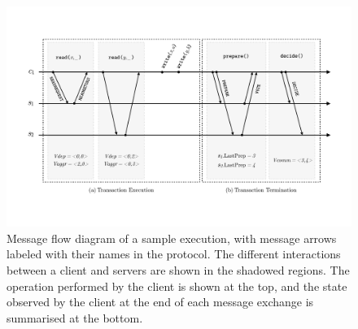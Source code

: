 \begin{figure}[t]
\vspace{-2cm}
\includegraphics[width=\textwidth]{figures/ch4_execution.pdf}
\vspace{-2cm}
\caption{Message flow diagram of a sample execution, with message arrows labeled with their names in the protocol. The different interactions between a client and servers are shown in the shadowed regions. The operation performed by the client is shown at the top, and the state observed by the client at the end of each message exchange is summarised at the bottom.}
\label{fig:sample_execution}
\end{figure}

